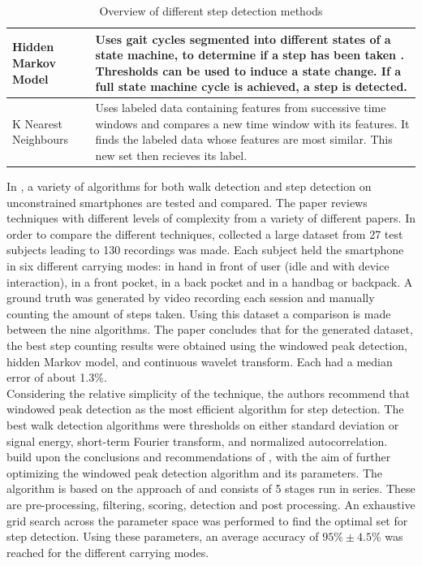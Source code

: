 \begin{table}
\begin{tabularx}{\linewidth}{@{} P{17mm} L}
		Hidden Markov Model & Uses gait cycles segmented into different states of a state machine, to determine if a step has been taken \cite{Ren2016a}. Thresholds can be used to induce a state change. If a full state machine cycle is achieved, a step is detected.\\ \hline
		K Nearest Neighbours & Uses labeled data containing features from successive time windows and compares a new time window with its features. It finds the labeled data whose features are most similar. This new set then recieves its label. \\
		\bottomrule
	\end{tabularx}
	\caption{Overview of different step detection methods}
	\label{tab:step_detection_comparison}
\end{table}

In \cite{Brajdic2013}, a variety of algorithms for both walk detection and step detection on unconstrained smartphones are tested and compared. The paper reviews techniques with different levels of complexity from a variety of different papers. In order to compare the different techniques, \citet{Brajdic2013} collected a large dataset from 27 test subjects leading to 130 recordings was made. Each subject held the smartphone in six different carrying modes: in hand in front of user (idle and with device interaction), in a front pocket, in a back pocket and in a handbag or backpack. A ground truth was generated by video recording each session and manually counting the amount of steps taken. Using this dataset a comparison is made between the nine algorithms.
\newline
The paper concludes that for the generated dataset, the best step counting results were obtained using the windowed peak detection, hidden Markov model, and continuous wavelet transform. Each had a median error of about 1.3\%.\\
Considering the relative simplicity of the technique, the authors recommend that windowed peak detection as the most efficient algorithm for step detection. The best walk detection algorithms were thresholds on either standard deviation or signal energy,  short-term Fourier transform, and normalized autocorrelation.\\
\citet{Salvi2018} build upon the conclusions and recommendations of \citet{Brajdic2013}, with the aim of further optimizing the windowed peak detection algorithm and its parameters. The algorithm is based on the approach of \citet{Palshikar2009} and consists of 5 stages run in series. These are pre-processing, filtering, scoring, detection and post processing. An exhaustive grid search across the parameter space was performed to find the optimal set for step detection. Using these parameters, an average accuracy of $95\% \pm 4.5\%$ was reached for the different carrying modes. 

